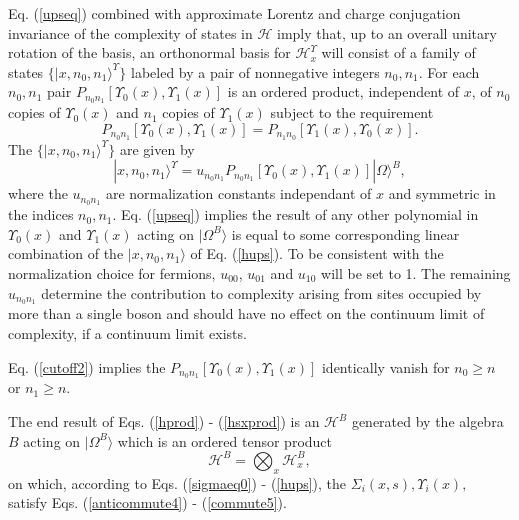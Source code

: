 \documentclass[twocolumn,amsmath,amssymb]{revtex4-1}
\begin{document}
Eq. (\ref{upseq}) combined with
approximate Lorentz and charge conjugation invariance of
the complexity of states in $\mathcal{H}$ imply that,
up to an overall unitary rotation of the basis, an
orthonormal basis for $\mathcal{H}^\Upsilon_x$ will
consist of a family of states $\{|x, n_0, n_1 \rangle ^\Upsilon\}$
labeled by a pair of nonnegative integers $n_0, n_1$.
For each $n_0, n_1$ pair $P_{n_0 n_1}[\Upsilon_0(x),\Upsilon_1(x)]$
is an ordered product, independent of $x$, of $n_0$ copies of $\Upsilon_0(x)$ and
$n_1$ copies of $\Upsilon_1(x)$ subject to the requirement
\begin{equation}
  \label{pn0n1}
  P_{n_0 n_1}[\Upsilon_0(x),\Upsilon_1(x)] = P_{n_1 n_0}[\Upsilon_1(x),\Upsilon_0(x)].
\end{equation}
The $\{|x, n_0, n_1 \rangle ^\Upsilon\}$ are given by
\begin{equation}
    \label{hups}
          | x, n_0, n_1 \rangle ^\Upsilon = u_{n_0 n_1} P_{n_0 n_1}[\Upsilon_0(x),\Upsilon_1(x)] |\Omega \rangle ^B,
\end{equation}
where the $u_{n_0 n_1}$ are normalization constants independant of $x$ and symmetric
in the indices $n_0, n_1$.
Eq. (\ref{upseq})
implies the result of any other
polynomial in $\Upsilon_0( x)$ and $\Upsilon_1( x)$ acting on $|\Omega^B \rangle $
is equal to some corresponding linear combination of the $|x, n_0, n_1 \rangle $ of
Eq. (\ref{hups}).
To be consistent with the normalization choice for fermions, $u_{0 0}$,
$u_{0 1}$ and $u_{1 0}$ will be set to 1. The remaining $u_{n_0 n_1}$ determine
the contribution to complexity arising from sites occupied by more than a single boson
and should have no effect on the continuum limit of complexity, if a continuum limit exists.

Eq. (\ref{cutoff2}) implies the $P_{n_0 n_1}[\Upsilon_0(x),\Upsilon_1(x)]$ identically
vanish for $n_0 \ge n$ or $n_1 \ge n$.

The end result of Eqs. (\ref{hprod}) - (\ref{hsxprod}) is an $\mathcal{H}^B$ generated by
the algebra $B$ acting on $|\Omega^B \rangle $ which is an ordered
tensor product
\begin{equation}
\label{tensorproduct4}
\mathcal{H}^B = \bigotimes_x \mathcal{H}^B_x,
\end{equation}
on which, according to Eqs. (\ref{sigmaeq0}) - (\ref{hups}),
the $\Sigma_i( x, s), \Upsilon_i( x),$ satisfy Eqs. (\ref{anticommute4}) - (\ref{commute5}).
\end{document}

